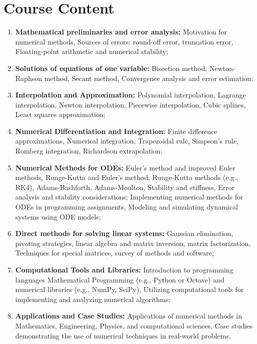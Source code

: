 \section*{Course Content}
\begin{enumerate}
\item[] {\bf Mathematical preliminaries and error analysis:} Motivation for numerical methods, Sources of errors: round-off error, truncation error, Floating-point arithmetic and numerical stability; 
\item[] {\bf Solutions of equations of one variable:} Bisection method, Newton-Raphson method, Secant method, Convergence analysis and error estimation;  
\item[] {\bf Interpolation and Approximation:} Polynomial interpolation, Lagrange interpolation, Newton interpolation, Piecewise interpolation, Cubic splines, Least squares approximation;
\item[] {\bf Numerical Differentiation and Integration:} Finite difference approximations, Numerical integration, Trapezoidal rule, Simpson's rule, Romberg integration, Richardson extrapolation; 
\item[] {\bf Numerical Methods for ODEs:} Euler's method and improved Euler methods, Runge-Kutta and Euler's method, Runge-Kutta methods (e.g., RK4), Adams-Bashforth, Adams-Moulton, Stability and stiffness, Error analysis and stability considerations;  Implementing numerical methods for ODEs in programming assignments, Modeling and simulating dynamical systems using ODE models;
\item[] {\bf Direct methods for solving linear systems:} Gaussian elimination, pivoting strategies, linear algebra and matrix inversion, matrix factorization, Techniques for special matrices, survey of methods and software;
\item[] {\bf Computational Tools and Libraries:} Introduction to programming languages Mathematical Programming (e.g., Python or Octave) and numerical libraries (e.g., NumPy, SciPy), Utilizing computational tools for implementing and analyzing numerical algorithms; 
\item[] {\bf Applications and Case Studies:} Applications of numerical methods in Mathematics, Engineering, Physics, and computational sciences, Case studies demonstrating the use of numerical techniques in real-world problems.
\end{enumerate}

